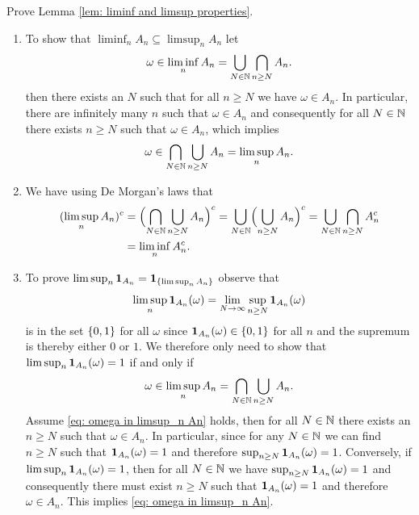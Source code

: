 
\begin{exercise}[subtitle={Liminf and Limsup Properties \Coffeecup}]
    \label{ex: liminf and limsup properties}
    Prove Lemma \ref{lem: liminf and limsup properties}. 
\end{exercise}
\begin{solution}
    \begin{enumerate}[label=(\roman*), wide=0pt]
        \item To show that  \(\liminf_n A_n \subseteq \limsup_n A_n\) let
        \[
            \omega \in \liminf_n A_n = \bigcup_{N\in \mathbb{N}} \bigcap_{n\ge N} A_n.
        \]
        then there exists an \(N\) such that for all \(n \ge N\) we have
        \(\omega \in A_n\). In particular, there are infinitely many \(n\)
        such that \(\omega \in A_n\) and consequently for all \(N\in \mathbb{N}\) there
        exists \(n\ge N\) such that \(\omega \in A_n\), which implies
        \[
            \omega \in \bigcap_{N\in \mathbb{N}} \bigcup_{n\ge N} A_n = \limsup_n A_n.
        \]
        
        \item\label{it: de morgans on liminf/limsup} We have using De Morgan's laws that
        \[
        \begin{aligned}
            (\limsup_n A_n)^c
            &= \Bigl(\bigcap_{N\in \mathbb{N}} \bigcup_{n\ge N} A_n\Bigr)^c
            = \bigcup_{N\in \mathbb{N}} \Bigl(\bigcup_{n\ge N} A_n\Bigr)^c
            = \bigcup_{N\in\mathbb{N}} \bigcap_{n\ge N} A_n^c
            \\
            &= \liminf_n A_n^c.
        \end{aligned}
        \]

        \item\label{it: function limsup to set limsup} To prove \(\limsup_n \ind{A_n} = \ind*{\limsup_n A_n}\) 
        observe that 
        \[
            \limsup_n \ind{A_n}(\omega)
            = \lim_{N\to \infty} \sup_{n\ge N} \ind{A_n}(\omega)
        \]
        is in the set \(\{0,1\}\) for all \(\omega\) since
        \(\ind{A_n}(\omega) \in \set{0,1}\) for all \(n\) and
        the supremum is thereby either \(0\) or \(1\). We therefore only need to show
        that \(\limsup_n \ind{A_n}(\omega) = 1\) if and only if
        \begin{equation}
            \label{eq: omega in limsup_n An} 
            \omega \in \limsup_n A_n = \bigcap_{N\in \mathbb{N}} \bigcup_{n\ge N} A_n.
        \end{equation}
        Assume \eqref{eq: omega in limsup_n An} holds, then for all \(N\in
        \mathbb{N}\) there exists an \(n \ge N\) such that \(\omega \in A_n\). In particular,
        since for any \(N\in \mathbb{N}\) we can find \(n\ge N\) such that \(\ind{A_n}(\omega) = 1\)
        and therefore \(\sup_{n\ge N} \ind{A_n}(\omega) = 1\). Conversely, if
        \(\limsup_n \ind{A_n}(\omega) = 1\), then for all \(N\in \mathbb{N}\) we have
        \(\sup_{n\ge N} \ind{A_n}(\omega) =1\) and consequently there must exist
        \(n\ge N\) such that \(\ind{A_n}(\omega) = 1\) and therefore
        \(\omega \in A_n\). This implies \eqref{eq: omega in limsup_n An}.


\end{enumerate}
\end{solution}

